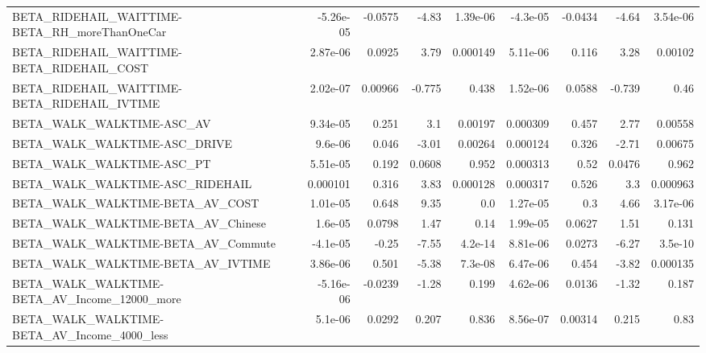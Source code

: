 \begin{tabular}{lrrrrrrrr}
BETA\_RIDEHAIL\_WAITTIME-BETA\_RH\_moreThanOneCar      &   -5.26e-05 &      -0.0575 &     -4.83 & 1.39e-06 &   -4.3e-05 &     -0.0434 &        -4.64 &      3.54e-06 \\
BETA\_RIDEHAIL\_WAITTIME-BETA\_RIDEHAIL\_COST          &    2.87e-06 &       0.0925 &      3.79 & 0.000149 &   5.11e-06 &       0.116 &         3.28 &       0.00102 \\
BETA\_RIDEHAIL\_WAITTIME-BETA\_RIDEHAIL\_IVTIME        &    2.02e-07 &      0.00966 &    -0.775 &    0.438 &   1.52e-06 &      0.0588 &       -0.739 &          0.46 \\
BETA\_WALK\_WALKTIME-ASC\_AV                          &    9.34e-05 &        0.251 &       3.1 &  0.00197 &   0.000309 &       0.457 &         2.77 &       0.00558 \\
BETA\_WALK\_WALKTIME-ASC\_DRIVE                       &     9.6e-06 &        0.046 &     -3.01 &  0.00264 &   0.000124 &       0.326 &        -2.71 &       0.00675 \\
BETA\_WALK\_WALKTIME-ASC\_PT                          &    5.51e-05 &        0.192 &    0.0608 &    0.952 &   0.000313 &        0.52 &       0.0476 &         0.962 \\
BETA\_WALK\_WALKTIME-ASC\_RIDEHAIL                    &    0.000101 &        0.316 &      3.83 & 0.000128 &   0.000317 &       0.526 &          3.3 &      0.000963 \\
BETA\_WALK\_WALKTIME-BETA\_AV\_COST                    &    1.01e-05 &        0.648 &      9.35 &      0.0 &   1.27e-05 &         0.3 &         4.66 &      3.17e-06 \\
BETA\_WALK\_WALKTIME-BETA\_AV\_Chinese                 &     1.6e-05 &       0.0798 &      1.47 &     0.14 &   1.99e-05 &      0.0627 &         1.51 &         0.131 \\
BETA\_WALK\_WALKTIME-BETA\_AV\_Commute                 &    -4.1e-05 &        -0.25 &     -7.55 &  4.2e-14 &   8.81e-06 &      0.0273 &        -6.27 &       3.5e-10 \\
BETA\_WALK\_WALKTIME-BETA\_AV\_IVTIME                  &    3.86e-06 &        0.501 &     -5.38 &  7.3e-08 &   6.47e-06 &       0.454 &        -3.82 &      0.000135 \\
BETA\_WALK\_WALKTIME-BETA\_AV\_Income\_12000\_more       &   -5.16e-06 &      -0.0239 &     -1.28 &    0.199 &   4.62e-06 &      0.0136 &        -1.32 &         0.187 \\
BETA\_WALK\_WALKTIME-BETA\_AV\_Income\_4000\_less        &     5.1e-06 &       0.0292 &     0.207 &    0.836 &   8.56e-07 &     0.00314 &        0.215 &          0.83 \\

\end{tabular}
